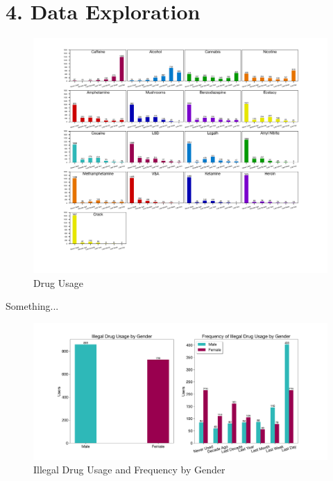 \documentclass[10pt]{article}
\begin{document}
\section*{4. Data Exploration}

\begin{figure}[h]
\caption{Drug Usage}
\centering
\includegraphics[scale=0.7]{drugs.png}
\end{figure}

Something...

\begin{figure}[H]
\caption{Illegal Drug Usage and Frequency by Gender}
\label{fig:genders}
\centering
\includegraphics[scale=0.4]{gender_freq.png}
\end{figure}
\end{document}
